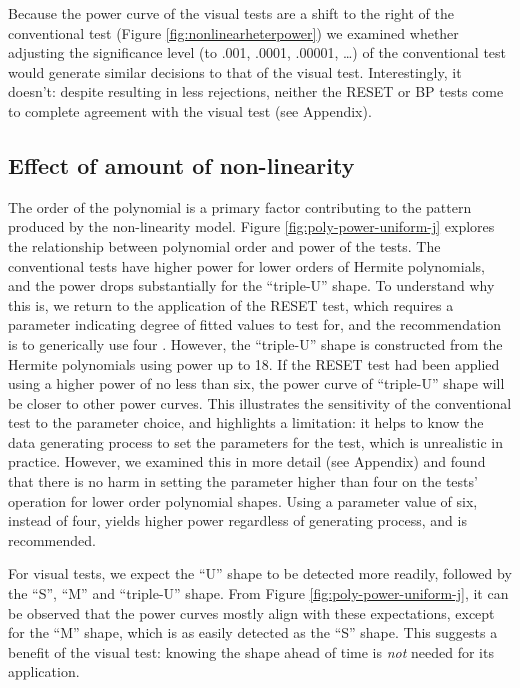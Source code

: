 \documentclass[]{interact}
\theoremstyle{plain}%
\theoremstyle{definition}
\theoremstyle{remark}
\begin{document}
Because the power curve of the visual tests are a shift to the right of
the conventional test (Figure \ref{fig:nonlinearheterpower}) we examined
whether adjusting the significance level (to .001, .0001, .00001,
\ldots) of the conventional test would generate similar decisions to
that of the visual test. Interestingly, it doesn't: despite resulting in
less rejections, neither the RESET or BP tests come to complete
agreement with the visual test (see Appendix).

\hypertarget{effect-of-amount-of-non-linearity}{%
\subsection{\texorpdfstring{Effect of amount of
non-linearity\label{nonlin-analysis}}{Effect of amount of non-linearity}}\label{effect-of-amount-of-non-linearity}}

The order of the polynomial is a primary factor contributing to the
pattern produced by the non-linearity model. Figure
\ref{fig:poly-power-uniform-j} explores the relationship between
polynomial order and power of the tests. The conventional tests have
higher power for lower orders of Hermite polynomials, and the power
drops substantially for the ``triple-U'' shape. To understand why this
is, we return to the application of the RESET test, which requires a
parameter indicating degree of fitted values to test for, and the
recommendation is to generically use four \citep{ramsey1969tests}.
However, the ``triple-U'' shape is constructed from the Hermite
polynomials using power up to 18. If the RESET test had been applied
using a higher power of no less than six, the power curve of
``triple-U'' shape will be closer to other power curves. This
illustrates the sensitivity of the conventional test to the parameter
choice, and highlights a limitation: it helps to know the data
generating process to set the parameters for the test, which is
unrealistic in practice. However, we examined this in more detail (see
Appendix) and found that there is no harm in setting the parameter
higher than four on the tests' operation for lower order polynomial
shapes. Using a parameter value of six, instead of four, yields higher
power regardless of generating process, and is recommended.

For visual tests, we expect the ``U'' shape to be detected more readily,
followed by the ``S'', ``M'' and ``triple-U'' shape. From Figure
\ref{fig:poly-power-uniform-j}, it can be observed that the power curves
mostly align with these expectations, except for the ``M'' shape, which
is as easily detected as the ``S'' shape. This suggests a benefit of the
visual test: knowing the shape ahead of time is \emph{not} needed for
its application.
\end{document}
